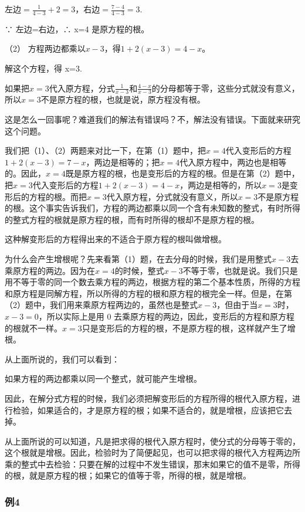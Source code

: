 左边\(= \frac{1}{4 - 3} + 2 = 3\)，右边\(= \frac{7 - 4}{4 - 3} = 3.\)

∵ 左边=右边，∴ x=4 是原方程的根。

（2） 方程两边都乘以\(x - 3\)，得\(1 + 2(x - 3) = 4 - x\)。

解这个方程，得 x=3.

如果把\(x = 3\)代入原方程，分式\(\frac{1}{x - 3}\)和\(\frac{4 - x}{x - 3}\)的分母都等于零，这些分式就没有意义，所以\(x = 3\)不是原方程的根，也就是说，原方程没有根。

这是怎么一回事呢？难道我们的解法有错误吗？不，解法没有错误。下面就来研究这个问题。

我们把（1）、（2）两题来对比一下，在第（1）题中，把\(x = 4\)代入变形后的方程\(1 + 2(x - 3) = 7 - x\)，两边是相等的；把\(x = 4\)代入原方程中，两边也是相等的。因此，\(x = 4\)既是原方程的根，也是变形后的方程的根。但是在第（2）题中，把\(x = 3\)代入变形后的方程\(1 + 2(x - 3) = 4 - x\)，两边是相等的，所以\(x = 3\)是变形后的方程的根。而把\(x = 3\)代入原方程，分式就没有意义，所以\(x = 3\)不是原方程的根。这个事实告诉我们，方程的两边都乘以同一个含有未知数的整式，有时所得的整式方程的根就是原方程的根，而有时所得的根却不是原方程的根。

这种解变形后的方程得出来的不适合于原方程的根叫做增根。

为什么会产生增根呢？先来看第（1）题，在去分母的时候，我们是用整式\(x - 3\)去乘原方程的两边。因为在\(x = 4\)的时候，整式\(x - 3\)不等于零，也就是说。我们只是用不等于零的同一个数去乘方程的两边，根据方程的第二个基本性质，所得的方程和原方程是同解方程，所以所得的方程的根和原方程的根完全一样。但是，在第（2）题中，我们用来乘原方程两边的，虽然也是整式\(x - 3\)，但由于当\(x = 3\)时，\(x - 3 = 0\)，所以实际上是用
0
去乘原方程的两边，因此，变形后的方程和原方程的根就不一样。\(x = 3\)只是变形后的方程的根，不是原方程的根，这样就产生了增根。

从上面所说的，我们可以看到：

如果方程的两边都乘以同一个整式，就可能产生增根。

因此，在解分式方程的时候，我们必须把解变形后的方程所得的根代入原方程，进行检验，如果适合的，才是原方程的根；如果不适合的，就是增根，应该把它去掉。

从上面所说的可以知道，凡是把求得的根代入原方程时，使分式的分母等于零的，这个根就是增根。因此，检验时为了简便起见，也可以把求得的根代入方程两边所乘的整式中去检验：只要在解的过程中不发生错误，那末如果它的值不是零，所得的根，就是原方程的根；如果它的值等于零，所得的根，就是增根。

\subsubsection{例4}

